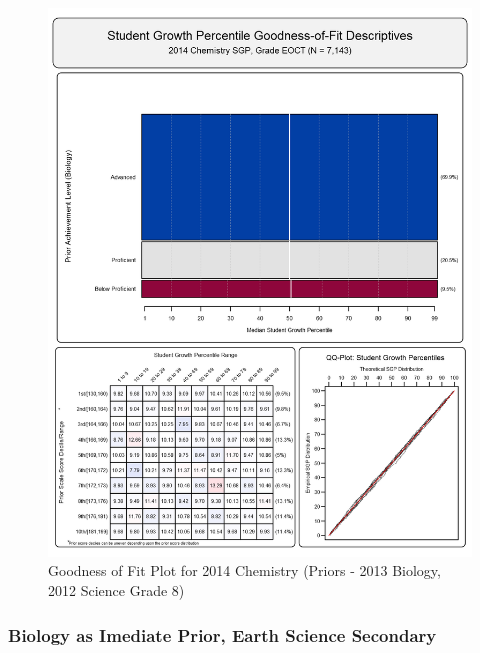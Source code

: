\documentclass[12pt]{article}
\begin{document}
\begin{figure}[htbp]
\centering
\includegraphics{../img/Goodness_of_Fit/CHEMISTRY.2014/2014_CHEMISTRY_EOCT;2013_BIOLOGY_EOCT;2012_SCIENCE_8.png}
\caption{Goodness of Fit Plot for 2014 Chemistry (Priors - 2013 Biology,
2012 Science Grade 8)}
\end{figure}

\clearpage 

\subsubsection{Biology as Imediate Prior, Earth Science
Secondary}\label{biology-as-imediate-prior-earth-science-secondary}
\end{document}
